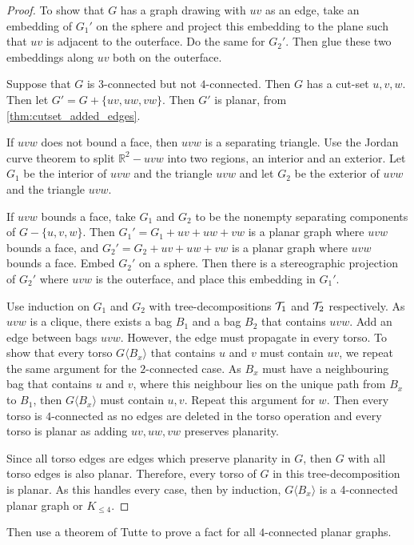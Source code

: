 \begin{proof}
	To show that $G$ has a graph drawing with $uv$ as an edge, take an embedding of $G_1'$ on the sphere and project this embedding to the plane such that $uv$ is adjacent to the outerface. Do the same for $G_2'$. Then glue these two embeddings along $uv$ both on the outerface. 

	Suppose that $G$ is $3$-connected but not $4$-connected. Then $G$ has a cut-set $u,v,w$. Then let $G' = G + \{uv, uw, vw\}$. Then $G'$ is planar, from \cref{thm:cutset_added_edges}. 
	
	If $uvw$ does not bound a face, then $uvw$ is a separating triangle. Use the Jordan curve theorem to split $\mathbb{R}^2 - uvw$ into two regions, an interior and an exterior. Let $G_1$ be the interior of $uvw$ and the triangle $uvw$ and let $G_2$ be the exterior of $uvw$ and the triangle $uvw$. 

	If $uvw$ bounds a face, take $G_1$ and $G_2$ to be the nonempty separating components of $G - \{u,v,w\}$. Then $G_1' = G_1 + uv + uw + vw$ is a planar graph where $uvw$ bounds a face, and $G_2' = G_2 + uv + uw + vw$ is a planar graph where $uvw$ bounds a face. Embed $G_2'$ on a sphere. Then there is a stereographic projection of $G_2'$ where $uvw$ is the outerface, and place this embedding in $G_1'$. 

	Use induction on $G_1$ and $G_2$ with tree-decompositions $\mathcal{T}_1$ and $\mathcal{T}_2$ respectively. As $uvw$ is a clique, there exists a bag $B_1$ and a bag $B_2$ that contains $uvw$. Add an edge between bags $uvw$. However, the edge must propagate in every torso. To show that every torso $G\langle B_x \rangle$ that contains $u$ and $v$ must contain $uv$, we repeat the same argument for the $2$-connected case. As $B_x$ must have a neighbouring bag that contains $u$ and $v$, where this neighbour lies on the unique path from $B_x$ to $B_1$, then $G\langle B_x \rangle$ must contain $u, v$. Repeat this argument for $w$. Then every torso is $4$-connected as no edges are deleted in the torso operation and every torso is planar as adding $uv, uw, vw$ preserves planarity. 

	Since all torso edges are edges which preserve planarity in $G$, then $G$ with all torso edges is also planar. Therefore, every torso of $G$ in this tree-decomposition is planar.
	As this handles every case, then by induction, $G \langle B_x \rangle$ is a 4-connected planar graph or $K_{\leq 4}$. 
\end{proof}
Then use a theorem of Tutte to prove a fact for all $4$-connected planar graphs. 

